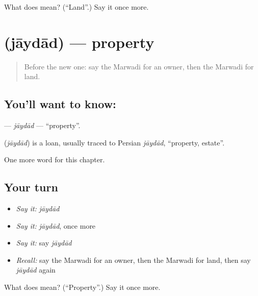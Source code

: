 \begin{tcolorbox}[breakable,colback=teal!4,colframe=teal!35!black,title={Before you move on}]
What does  mean? (\textquotedblleft{}Land\textquotedblright{}.) Say it once more.
\end{tcolorbox}
\section[\texorpdfstring{\mw{जायदाद} (jāydād)}{जायदाद (jāydād)}]{ (jāydād) — property}

\label{lesson:MW-C115-jaydad}



\begin{quote}
Before the new one: say the Marwadi for an owner, then the Marwadi for land.
\end{quote}

\subsection*{You'll want to know: }
\textbf{} — \emph{jāydād} — \textquotedblleft{}property\textquotedblright{}.

\begin{cousinweb}
\textbf{} (\emph{jāydād}) is a loan, usually traced to Persian \emph{jāydād}, \textquotedblleft{}property, estate\textquotedblright{}.
\end{cousinweb}

\begin{grammarlens}[title={What you've built}]
One more word for this chapter.
\end{grammarlens}

\subsection*{Your turn}
\begin{itemize}
\raggedright
  \item \emph{Say it:} \emph{jāydād}
  \item \emph{Say it:} \emph{jāydād}, once more
  \item \emph{Say it:} say \emph{jāydād}
  \item \emph{Recall:} say the Marwadi for an owner, then the Marwadi for land, then say \emph{jāydād} again
\end{itemize}

\begin{tcolorbox}[breakable,colback=teal!4,colframe=teal!35!black,title={Before you move on}]
What does  mean? (\textquotedblleft{}Property\textquotedblright{}.) Say it once more.
\end{tcolorbox}
